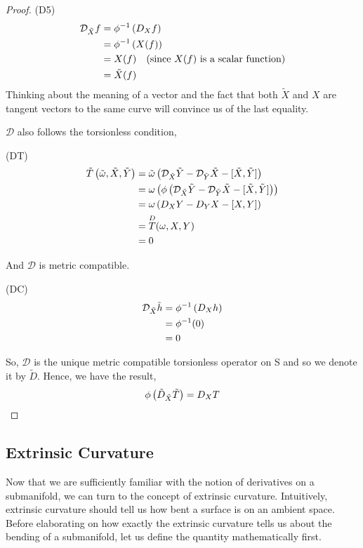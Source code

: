 \begin{proof}
(D5)
\begin{align*}
	\mathcal{D}_{\tilde{X}} f &= \phi^{-1}\left( D_X f \right) \\
	&= \phi^{-1}\left( X(f) \right) \\
	&= X(f) \quad \text{(since $X(f)$ is a scalar function)} \\
	&= \tilde{X}(f)
\end{align*}
Thinking about the meaning of a vector and the fact that both $\tilde{X}$ and $X$ are tangent vectors to the same curve will convince us of the last equality.

$\mathcal{D}$ also follows the torsionless condition,

(DT)
\begin{align*}
	\tilde{T}\left( \tilde{\omega}, \tilde{X}, \tilde{Y} \right) &= \tilde{\omega}\left( \mathcal{D}_{\tilde{X}} \tilde{Y} - \mathcal{D}_{\tilde{Y}} \tilde{X} - [\tilde{X}, \tilde{Y}] \right) \\
	&= \omega\left( \phi\left( \mathcal{D}_{\tilde{X}} \tilde{Y} - \mathcal{D}_{\tilde{Y}} \tilde{X} - [\tilde{X}, \tilde{Y}] \right) \right) \\
	&= \omega\left( D_X Y - D_Y X - [X, Y] \right) \\
	&= \overset{D}{T}(\omega, X, Y) \\
	&= 0
\end{align*}

And $\mathcal{D}$ is metric compatible.

(DC)
\begin{align*}
	\mathcal{D}_{\tilde{X}} \tilde{h} &= \phi^{-1}\left( D_X h \right) \\
	&= \phi^{-1}(0) \\
	&= 0
\end{align*}

So, $\mathcal{D}$ is the unique metric compatible torsionless operator on S and so we denote it by $\tilde{D}$. Hence, we have the result,
\begin{align*}
	\phi\left( \tilde{D}_{\tilde{X}} \tilde{T} \right) = D_X T
\end{align*}
\end{proof}







\subsection{Extrinsic Curvature}
Now that we are sufficiently familiar with the notion of derivatives on a submanifold, we can turn to the concept of extrinsic curvature. Intuitively, extrinsic curvature should tell us how bent a surface is on an ambient space. Before elaborating on how exactly the extrinsic curvature tells us about the bending of a submanifold, let us define the quantity mathematically first.

